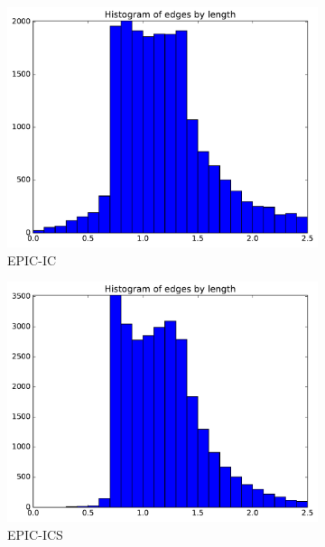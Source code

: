 \documentclass[3p,times,procedia,number]{elsarticle}
\begin{document}
\begin{figure}
\begin{subfigure}{.4\textwidth}
\centering
\includegraphics[width=\textwidth]{epic-ic-cube-cylinder-polar-1-length.pdf}
\caption{EPIC-IC}
\end{subfigure}
\begin{subfigure}{.4\textwidth}
\centering
\includegraphics[width=\textwidth]{epic-ics-cube-cylinder-polar-1-length.pdf}
\caption{EPIC-ICS}
\end{subfigure}
\begin{subfigure}{.4\textwidth}
\centering

\end{subfigure}
\end{figure}
\end{document}
